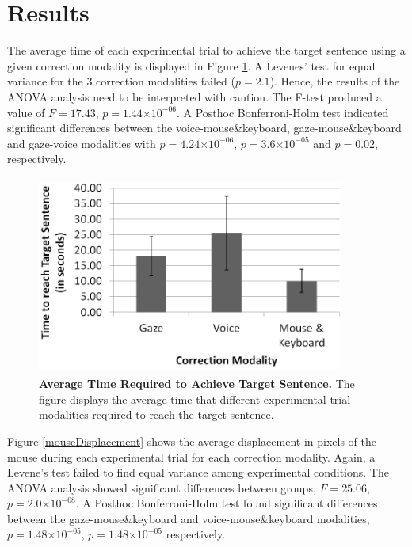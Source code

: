 \documentclass[]{article}
\providecommand{\e}[1]{\ensuremath{\times 10^{#1}}}
\begin{document}
\section{Results}
The average time of each experimental trial to achieve the target sentence using a given correction modality is
displayed in Figure \ref{timeFig}. A Levenes' test for equal variance for the 3 correction modalities failed ($p=2.1$).
Hence, the results of the ANOVA analysis need to be interpreted with caution. The F-test produced a value of $F=17.43$,
$p=1.44\e{-06}$. A Posthoc Bonferroni-Holm test indicated significant differences between the voice-mouse\&keyboard,
gaze-mouse\&keyboard and gaze-voice modalities with $p=4.24\e{-06}$, $p=3.6\e{-05}$ and $p=0.02$, respectively.
 

\begin{figure}[ht]
\begin{center}
\includegraphics[width=0.9\textwidth,height=65mm]{figures/time.png}
\end{center}
\vspace{-3mm}
\caption{\textbf{Average Time Required to Achieve Target Sentence.} The figure displays the average time that different
experimental trial modalities required to reach the target sentence.}
\label{timeFig}
\end{figure}


Figure \ref{mouseDisplacement} shows the average displacement in pixels of the mouse during each experimental trial
for each correction modality. Again, a Levene's test failed to find equal variance among experimental conditions. The ANOVA
analysis showed significant differences between groups,  $F=25.06$, $p=2.0\e{-08}$. A Posthoc Bonferroni-Holm test
found significant differences between the gaze-mouse\&keyboard and voice-mouse\&keyboard modalities,  $p=1.48\e{-05}$,
$p=1.48\e{-05}$ respectively.
\end{document}
